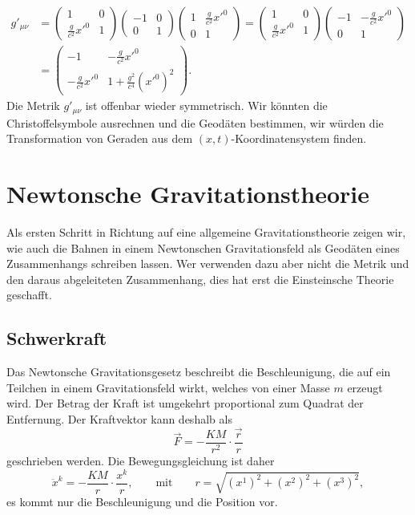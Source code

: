 \begin{align*}
g'_{\mu\nu}
&=
\begin{pmatrix}
1&0\\
\frac{g}{c^2}x'^0&1
\end{pmatrix}
\begin{pmatrix}
-1&0\\0&1
\end{pmatrix}
\begin{pmatrix}
1&\frac{g}{c^2}x'^0\\
0&1
\end{pmatrix}
=
\begin{pmatrix}
1&0\\
\frac{g}{c^2}x'^0&1
\end{pmatrix}
\begin{pmatrix}
-1&-\frac{g}{c^2}x'^0\\
 0& 1
\end{pmatrix}
\\
&=
\begin{pmatrix}
-1&-\frac{g}{c^2}x'^0\\
-\frac{g}{c^2}x'^0&1+\frac{g^2}{c^4}(x'^0)^2
\end{pmatrix}.
\end{align*}
Die Metrik $g'_{\mu\nu}$ ist offenbar wieder symmetrisch.
Wir könnten die Christoffelsymbole ausrechnen und die Geodäten
bestimmen, wir würden die Transformation von Geraden aus dem
$(x,t)$-Koordinaten\-system finden.

\section{Newtonsche Gravitationstheorie%
\label{skript:section:newtonschegravitationstheorie}}
Als ersten Schritt in Richtung auf eine allgemeine Gravitationstheorie
zeigen wir, wie auch die Bahnen in einem Newtonschen Gravitationsfeld 
als Geodäten eines Zusammenhangs schreiben lassen.
Wer verwenden dazu aber nicht die Metrik und den daraus abgeleiteten 
Zusammenhang, dies hat erst die Einsteinsche Theorie geschafft.

\subsection{Schwerkraft}
Das Newtonsche Gravitationsgesetz beschreibt die Beschleunigung, die
auf ein Teilchen in einem Gravitationsfeld wirkt, welches von einer
Masse $m$ erzeugt wird.
Der Betrag der Kraft ist umgekehrt proportional zum Quadrat der
Entfernung.
Der Kraftvektor kann deshalb als
\begin{equation}
\vec F = -\frac{KM}{r^2}\cdot\frac{\vec r}{r}
\label{skript:gravitation:gkraft}
\end{equation}
geschrieben werden.
Die Bewegungsgleichung ist daher 
\begin{equation}
\ddot x^k = -\frac{KM}{r}\cdot\frac{x^k}{r},
\qquad\text{mit}\qquad r = \sqrt{(x^1)^2+(x^2)^2+(x^3)^2},
\label{skript:gravitation:bewegungsgleichung}
\end{equation}
es kommt nur die Beschleunigung und die Position vor.

